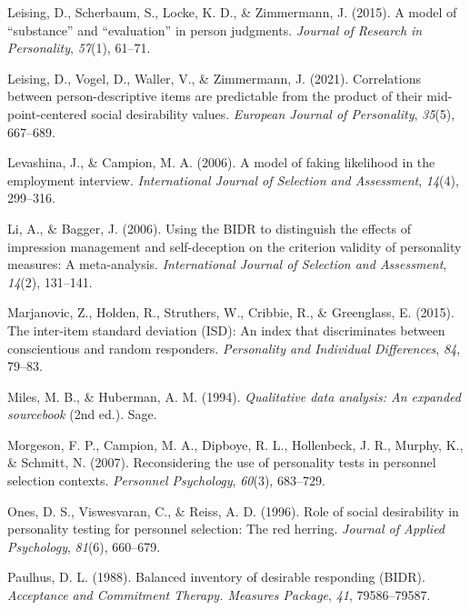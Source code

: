 \documentclass[
  ,jou]{apa6}
\newlength{\cslhangindent}
\newlength{\cslentryspacingunit} %
\newenvironment{CSLReferences}[2] %
 {%
  \setlength{\parindent}{0pt}
  \ifodd #1
  \let\oldpar\par
  \def\par{\hangindent=\cslhangindent\oldpar}
  \fi
  \setlength{\parskip}{#2\cslentryspacingunit}
 }%
 {}
\begin{document}
\begin{CSLReferences}{1}{0}
\leavevmode{}%
Leising, D., Scherbaum, S., Locke, K. D., \& Zimmermann, J. (2015). A model of {``substance''} and {``evaluation''} in person judgments. \emph{Journal of Research in Personality}, \emph{57}(1), 61--71.

\leavevmode{}%
Leising, D., Vogel, D., Waller, V., \& Zimmermann, J. (2021). Correlations between person-descriptive items are predictable from the product of their mid-point-centered social desirability values. \emph{European Journal of Personality}, \emph{35}(5), 667--689.

\leavevmode{}%
Levashina, J., \& Campion, M. A. (2006). A model of faking likelihood in the employment interview. \emph{International Journal of Selection and Assessment}, \emph{14}(4), 299--316.

\leavevmode{}%
Li, A., \& Bagger, J. (2006). Using the {BIDR} to distinguish the effects of impression management and self-deception on the criterion validity of personality measures: A meta-analysis. \emph{International Journal of Selection and Assessment}, \emph{14}(2), 131--141.

\leavevmode{}%
Marjanovic, Z., Holden, R., Struthers, W., Cribbie, R., \& Greenglass, E. (2015). The inter-item standard deviation ({ISD}): An index that discriminates between conscientious and random responders. \emph{Personality and Individual Differences}, \emph{84}, 79--83.

\leavevmode{}%
Miles, M. B., \& Huberman, A. M. (1994). \emph{Qualitative data analysis: An expanded sourcebook} (2nd ed.). Sage.

\leavevmode{}%
Morgeson, F. P., Campion, M. A., Dipboye, R. L., Hollenbeck, J. R., Murphy, K., \& Schmitt, N. (2007). Reconsidering the use of personality tests in personnel selection contexts. \emph{Personnel Psychology}, \emph{60}(3), 683--729.

\leavevmode{}%
Ones, D. S., Viswesvaran, C., \& Reiss, A. D. (1996). Role of social desirability in personality testing for personnel selection: The red herring. \emph{Journal of Applied Psychology}, \emph{81}(6), 660--679.

\leavevmode{}%
Paulhus, D. L. (1988). Balanced inventory of desirable responding ({BIDR}). \emph{Acceptance and Commitment Therapy. Measures Package}, \emph{41}, 79586--79587.


\end{CSLReferences}
\end{document}
